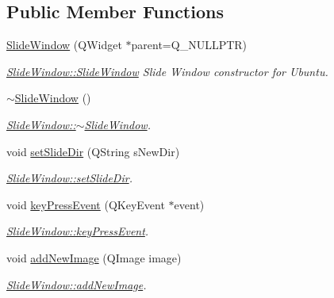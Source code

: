 \subsection*{Public Member Functions}
\begin{DoxyCompactItemize}
\item 
\mbox{\hyperlink{classSlideWindow_a069924b6d71578c14bbdedad2fa2497f}{Slide\+Window}} (Q\+Widget $\ast$parent=Q\+\_\+\+N\+U\+L\+L\+P\+TR)
\begin{DoxyCompactList}\small\item\em \mbox{\hyperlink{classSlideWindow_a069924b6d71578c14bbdedad2fa2497f}{Slide\+Window\+::\+Slide\+Window}} Slide Window constructor for Ubuntu. \end{DoxyCompactList}\item 
\mbox{\label{classSlideWindow_acdf4f09254d2d9d9cc8b06a2efe5bf68}} 
\mbox{\hyperlink{classSlideWindow_acdf4f09254d2d9d9cc8b06a2efe5bf68}{$\sim$\+Slide\+Window}} ()
\begin{DoxyCompactList}\small\item\em \mbox{\hyperlink{classSlideWindow_acdf4f09254d2d9d9cc8b06a2efe5bf68}{Slide\+Window\+::$\sim$\+Slide\+Window}}. \end{DoxyCompactList}\item 
void \mbox{\hyperlink{classSlideWindow_aff6b7e8c3b00f1a17bea3f2dd60a8ad1}{set\+Slide\+Dir}} (Q\+String s\+New\+Dir)
\begin{DoxyCompactList}\small\item\em \mbox{\hyperlink{classSlideWindow_aff6b7e8c3b00f1a17bea3f2dd60a8ad1}{Slide\+Window\+::set\+Slide\+Dir}}. \end{DoxyCompactList}\item 
void \mbox{\hyperlink{classSlideWindow_a0527c72528a39dfbe2a0efc611242464}{key\+Press\+Event}} (Q\+Key\+Event $\ast$event)
\begin{DoxyCompactList}\small\item\em \mbox{\hyperlink{classSlideWindow_a0527c72528a39dfbe2a0efc611242464}{Slide\+Window\+::key\+Press\+Event}}. \end{DoxyCompactList}\item 
void \mbox{\hyperlink{classSlideWindow_ac85464e7641438ddc5e9051245571135}{add\+New\+Image}} (Q\+Image image)
\begin{DoxyCompactList}\small\item\em \mbox{\hyperlink{classSlideWindow_ac85464e7641438ddc5e9051245571135}{Slide\+Window\+::add\+New\+Image}}. \end{DoxyCompactList}\item 

\end{DoxyCompactItemize}
